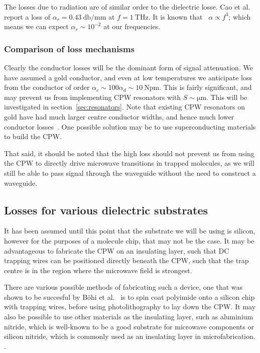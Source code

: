 The losses due to radiation are of similar order to the dielectric losse. Cao et
al.~\cite{L.Cao2013} report a loss of $\alpha_r = \SI{0.43}{\decibel \per \milli
\meter}$ at $f=\SI{1}{\tera\hertz}$. It is known that~\cite{81658} $\alpha
\propto f^3$; which means we can expect $\alpha_r \sim 10^{-2}$  at
our frequencies.

\subsubsection{Comparison of loss mechanisms}

Clearly the conductor losses will be the dominant form of signal attenuation. We
have assumed a gold conductor, and even at low temperatures we anticipate loss
from the conductor of order $\alpha_c \sim 100 \alpha_d \sim
\SI{10}{\neper\meter}$. This is fairly significant, and may prevent us from
implementing CPW resonators with $S\sim\si{\micro\meter}$. This will be
investigated in section~\ref{sec:resonators}. Note that existing
CPW resonators on gold have had much larger centre conductor widths, and hence
much lower conductor losses~\cite{1127105}. One possible solution may be to use
superconducting materials to build the CPW.

That said, it should be noted that the high loss should not prevent us from
using the CPW to directly drive microwave transitions in trapped molecules, as
we will still be able to pass signal through the waveguide without the need to
construct a waveguide.


\subsection{Losses for various dielectric substrates}

It has been assumed until this point that the substrate we will be using is
silicon, however for the purposes of a molecule chip, that may not be the case.
It may be advantageous to fabricate the CPW on an insulating layer, such that
DC trapping wires can be positioned directly beneath the CPW, such that the trap
centre is in the region where the microwave field is strongest.

There are various possible methods of fabricating such a device, one that was
shown to be succesful by B\"ohi et al.~\cite{Boehi2009} is to spin coat
polyimide onto a silicon chip with trapping wires, before using photolithography
to lay down the CPW. It may also be possible to use other materials as the
insulating layer, such as aluminium nitride, which is well-known to be a good
substrate for microwave components  or silicon nitride, which is
commonly used as an insulating layer in microfabrication. .

